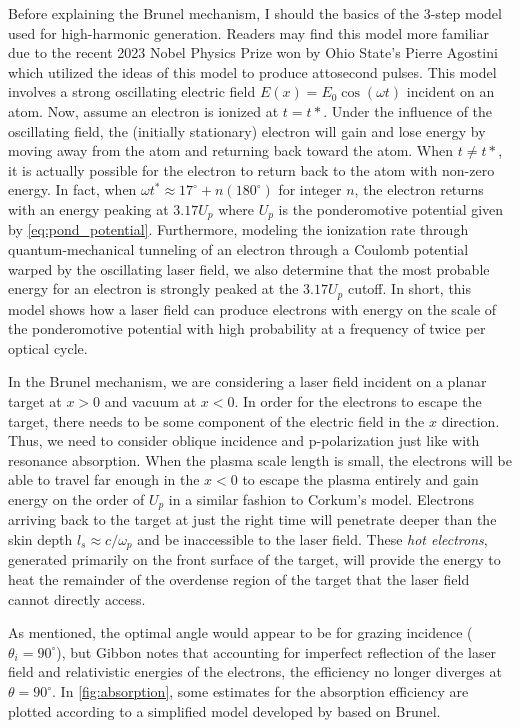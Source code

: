 Before explaining the Brunel mechanism, I should the basics of the 3-step model used for high-harmonic generation\cite{Corkum_1993_PRL}. Readers may find this model more familiar due to the recent 2023 Nobel Physics Prize won by Ohio State's Pierre Agostini\cite{Nobel_2023} which utilized the ideas of this model to produce attosecond pulses. This model involves a strong oscillating electric field $E(x) = E_0 \cos(\omega t)$ incident on an atom. Now, assume an electron is ionized at $t = t*$. Under the influence of the oscillating field, the (initially stationary) electron will gain  and lose energy by moving away from the atom and returning back toward the atom. When $t \neq t*$, it is actually possible for the electron to return back to the atom with non-zero energy. In fact, when $\omega t^* \approx 17^\circ + n (180^\circ)$ for integer $n$, the electron returns with an energy peaking at $3.17 U_p$ where $U_p$ is the ponderomotive potential given by \cref{eq:pond_potential}. Furthermore, modeling the ionization rate through quantum-mechanical tunneling of an electron through a Coulomb potential warped by the oscillating laser field, we also determine that the most probable energy for an electron is strongly peaked at the $3.17 U_p$ cutoff. In short, this model shows how a laser field can produce electrons with energy on the scale of the ponderomotive potential with high probability at a frequency of twice per optical cycle. 

In the Brunel mechanism\cite{Brunel_1987_PRL}, we are considering a laser field incident on a planar target at $x > 0$ and vacuum at $x < 0$. In order for the electrons to escape the target, there needs to be some component of the electric field in the $x$ direction. Thus, we need to consider oblique incidence and p-polarization just like with resonance absorption. When the plasma scale length is small, the electrons will be able to travel far enough in the $x < 0$ to escape the plasma entirely and gain energy on the order of $U_p$ in a similar fashion to Corkum's model\cite{Corkum_1993_PRL}. Electrons arriving back to the target at just the right time will penetrate deeper than the skin depth $l_s \approx c / \omega_p$ and be inaccessible to the laser field\cite{Gibbon_2005_Plasma}. These \emph{hot electrons}, generated primarily on the front surface of the target, will provide the energy to heat the remainder of the overdense region of the target that the laser field cannot directly access. 

As mentioned, the optimal angle would appear to be for grazing incidence ($\theta_i = 90^\circ$), but Gibbon notes that accounting for imperfect reflection of the laser field and relativistic energies of the electrons, the efficiency no longer diverges at $\theta = 90^\circ$\cite{Gibbon_2005_Plasma}. In \cref{fig:absorption}, some estimates for the absorption efficiency are plotted according to a simplified model developed by \cite{Gibbon_2005_Plasma} based on Brunel\cite{Brunel_1987_PRL}.

